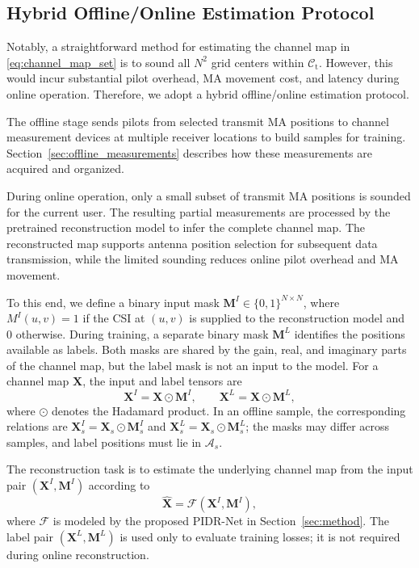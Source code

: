 \documentclass[lettersize,journal]{IEEEtran}
\newcommand{\mat}[1]{\mathbf{#1}}
\newcommand{\od}{\odot}
\begin{document}
\subsection{Hybrid Offline/Online Estimation Protocol}

Notably, a straightforward method for estimating the channel map in \eqref{eq:channel_map_set} is to sound all $N^2$ grid centers within $\mathcal{C}_{\mathrm t}$. However, this would incur substantial pilot overhead, MA movement cost, and latency during online operation. Therefore, we adopt a hybrid offline/online estimation protocol.

The offline stage sends pilots from selected transmit MA positions to channel measurement devices at multiple receiver locations to build samples for training. Section~\ref{sec:offline_measurements} describes how these measurements are acquired and organized.

During online operation, only a small subset of transmit MA positions is sounded for the current user. The resulting partial measurements are processed by the pretrained reconstruction model to infer the complete channel map. The reconstructed map supports antenna position selection for subsequent data transmission, while the limited sounding reduces online pilot overhead and MA movement.

To this end, we define a binary input mask $\mat{M}^{I}\in\{0,1\}^{N\times N}$, where $M^{I}(u,v)=1$ if the CSI at $(u,v)$ is supplied to the reconstruction model and $0$ otherwise. During training, a separate binary mask $\mat{M}^{L}$ identifies the positions available as labels. Both masks are shared by the gain, real, and imaginary parts of the channel map, but the label mask is not an input to the model. For a channel map $\mat{X}$, the input and label tensors are
\begin{equation}
    \mat{X}^{I}=\mat{X}\od\mat{M}^{I},\qquad
    \mat{X}^{L}=\mat{X}\od\mat{M}^{L},
    \label{eq:input_label_maps}
\end{equation}
where $\od$ denotes the Hadamard product. In an offline sample, the corresponding relations are $\mat{X}_s^{I}=\mat{X}_s\od\mat{M}_s^{I}$ and $\mat{X}_s^{L}=\mat{X}_s\od\mat{M}_s^{L}$; the masks may differ across samples, and label positions must lie in $\mathcal{A}_s$.

The reconstruction task is to estimate the underlying channel map from the input pair $(\mat{X}^{I},\mat{M}^{I})$ according to
\begin{equation}
    \widehat{\mat{X}}=\mathcal{F}(\mat{X}^{I},\mat{M}^{I}),
    \label{eq:task}
\end{equation}
where $\mathcal{F}$ is modeled by the proposed PIDR-Net in Section~\ref{sec:method}. The label pair $(\mat{X}^{L},\mat{M}^{L})$ is used only to evaluate training losses; it is not required during online reconstruction.
\end{document}
